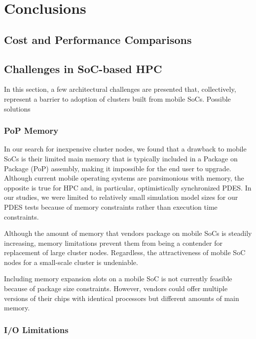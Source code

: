 \documentclass[11pt]{book}
\begin{document}
\newpage
\chapter{Conclusions}
\label{conclusions}

\section{\textbf{Cost and Performance Comparisons}}

\section{\textbf{Challenges in SoC-based HPC}}

In this section, a few architectural challenges are presented that,
collectively, represent a barrier to adoption of clusters built from mobile
SoCs. Possible solutions

\subsection{\textbf{PoP Memory}}

In our search for inexpensive cluster nodes, we found that a drawback to mobile
SoCs is their limited main memory that is typically included in a Package on
Package (PoP) assembly, making it impossible for the end user to
upgrade. Although current mobile operating systems are parsimonious with memory,
the opposite is true for HPC and, in particular, optimistically synchronized
PDES. In our studies, we were limited to relatively small simulation model sizes
for our PDES tests because of memory constraints rather than execution time
constraints.

Although the amount of memory that vendors package on mobile SoCs is steadily
increasing, memory limitations prevent them from being a contender for
replacement of large cluster nodes. Regardless, the attractiveness of mobile SoC
nodes for a small-scale cluster is undeniable.

Including memory expansion slots on a mobile SoC is not currently feasible
because of package size constraints. However, vendors could offer multiple
versions of their chips with identical processors but different amounts of main
memory.

\subsection{\textbf{I/O Limitations}}
\end{document}
